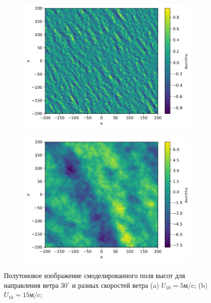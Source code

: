 \begin{figure}[h!]
    \begin{subfigure}{0.5\linewidth}
        \centering
        \includegraphics[width=\linewidth]{img/heights5}
        \caption{}
    \end{subfigure}
    \begin{subfigure}{0.5\linewidth}
        \centering
        \includegraphics[width=\linewidth]{img/heights15}
        \caption{}
    \end{subfigure}
    \caption{ Полутоновое изображение смоделированного поля высот для
        направления ветра $30^\circ$ и разных скоростей ветра
        (a) $U_{10} = 5 \text{м}/\text{c}$;
        (b) $U_{10} = 15 \text{м}/\text{c}$;
}
    \label{fig:water}
\end{figure}
